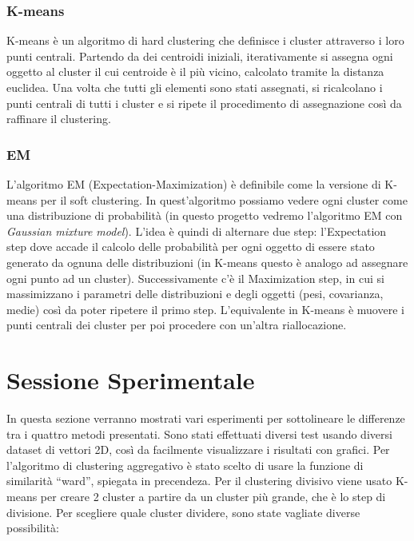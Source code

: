 \documentclass{llncs}
\begin{document}
	\subsubsection{K-means}
	K-means è un algoritmo di hard clustering che definisce i cluster attraverso i loro punti centrali.
	Partendo da dei centroidi iniziali, iterativamente si assegna ogni oggetto al cluster il cui centroide è
	il più vicino, calcolato tramite la distanza euclidea. Una volta che tutti gli elementi sono stati assegnati, si ricalcolano i punti centrali di tutti
	i cluster e si ripete il procedimento di assegnazione così da raffinare il clustering.

	\subsubsection{EM}
	L'algoritmo EM (Expectation-Maximization) è definibile come la versione di K-means per il soft clustering.
	In quest'algoritmo possiamo vedere ogni cluster come una distribuzione di probabilità (in questo progetto vedremo l'algoritmo EM con \textit{Gaussian mixture model}).
	L'idea è quindi di alternare due step: l'Expectation step dove accade il calcolo delle probabilità per ogni oggetto di essere stato generato da ognuna delle distribuzioni 
	(in K-means questo è analogo ad assegnare ogni punto ad un cluster). 
	Successivamente c'è il Maximization step, in cui si massimizzano i parametri delle distribuzioni e degli oggetti (pesi, covarianza, medie) così da poter ripetere il primo step. 
	L'equivalente in K-means è muovere i punti centrali dei cluster per poi procedere con un'altra riallocazione.

	\section{Sessione Sperimentale}
	In questa sezione verranno mostrati vari esperimenti per sottolineare le differenze tra i quattro metodi presentati. Sono stati effettuati diversi test usando diversi dataset di vettori 2D, così da 
	facilmente visualizzare i risultati con grafici. Per l'algoritmo di clustering aggregativo è stato scelto di usare la funzione di similarità ``ward'', spiegata in precendeza. Per il clustering
	divisivo viene usato K-means per creare 2 cluster a partire da un cluster più grande, che è lo step di divisione. Per scegliere quale cluster dividere, sono state vagliate diverse possibilità:
	
\end{document}
